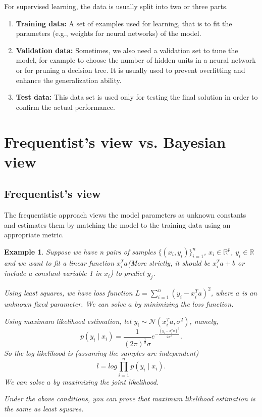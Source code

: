 \documentclass[11pt]{article}
\def\MN{{\mathcal N}}
\def\BR{{\mathbb R}}
\newtheorem{example}{Example}[section]
\begin{document}
For supervised learning, the data is usually split into two or three parts.
\begin{enumerate}[(1)]
\item \textbf{Training data:} A set of examples used for learning, that is to fit the parameters (e.g., weights for neural networks) of the model. 
\item \textbf{Validation data:}  Sometimes, we also need a validation set to tune the model, for example to choose the number of hidden units in a neural network or for pruning a decision tree. It is usually used to prevent overfitting and enhance the generalization ability.
\item \textbf{Test data:} This data set is used only for testing the final solution in order to confirm the actual performance.  
\end{enumerate}

\section{Frequentist's view vs. Bayesian view}
\subsection{Frequentist's view}
The frequentistic approach views the model parameters as unknown constants and estimates them by matching the model to the training data using an appropriate metric.

\begin{example}
Suppose we have n pairs of samples $\{(x_i, y_i)\}_{i=1}^{n}$, $x_i \in \BR^p$, $y_i \in \BR$ and we want to fit a linear function $x_i^Ta$(More strictly, it should be $x_i^T a+b$ or include a constant variable 1 in $x_i$) to predict $y_j$.

Using least squares, we have loss function $L = \sum_{i=1}^n (y_i - x_i^T a)^2$, where $a$ is an unknown fixed parameter. We can solve $a$ by minimizing the loss function.

Using maximum likelihood estimation, let $y_i \sim \MN(x_i^T a, \sigma^2)$, namely, $$p(y_i \mid x_i)=\frac{1}{(2\pi)^{\frac{1}{2}}\sigma}e^{-\frac{(y_i-x_i^Ta)^2}{2\sigma^2}}.$$ So the log likelihood is (assuming the samples are independent) $$l=log \prod_{i=1}^{n}p(y_i \mid x_i).$$We can solve $a$ by maximizing the joint likelihood.

Under the above conditions, you can prove that maximum likelihood estimation is the same as least squares.
\end{example}
\end{document}
